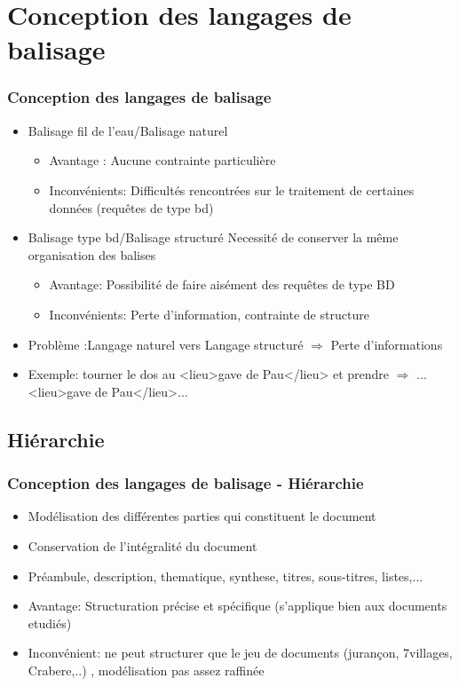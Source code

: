 \documentclass[10pt, compress]{beamer}
\begin{document}
\section{Conception des langages de balisage}
\begin{frame}[fragile]
 \frametitle{Conception des langages de balisage}
  \begin{itemize}[<+->]
  [square]
   \item {Balisage fil de l'eau/Balisage naturel}
    \begin{itemize}
     \item Avantage : Aucune contrainte particulière
     \item Inconvénients: Difficultés rencontrées sur le traitement de certaines données (requêtes de type bd)
    \end{itemize}
   \item {Balisage type bd/Balisage structuré Necessité de conserver la même organisation des balises}
    \begin{itemize}
     \item Avantage: Possibilité de faire aisément des requêtes de type BD
     \item Inconvénients: Perte d'information, contrainte de structure
    \end{itemize}
   \item {Problème :Langage naturel vers Langage structuré $\Rightarrow$ Perte d'informations}
   \item Exemple: tourner le dos au <lieu>gave de Pau</lieu> et prendre
   $\Rightarrow$ ...<lieu>gave de Pau</lieu>...
  \end{itemize}
\end{frame}

\subsection{Hiérarchie}
\begin{frame}[fragile]
 \frametitle{Conception des langages de balisage - Hiérarchie}
  \begin{itemize}[<+->]
  [square]
    \item{Modélisation des différentes parties qui constituent le document}
    \item{Conservation de l'intégralité du document}
    \item{Préambule, description, thematique, synthese, titres, sous-titres, listes,...}
    \item{Avantage: Structuration précise et spécifique (s'applique bien aux documents etudiés) }
    \item{Inconvénient: ne peut structurer que le jeu de documents (jurançon, 7villages, Crabere,..) , modélisation pas assez raffinée}
  \end{itemize}
\end{frame}
\end{document}
